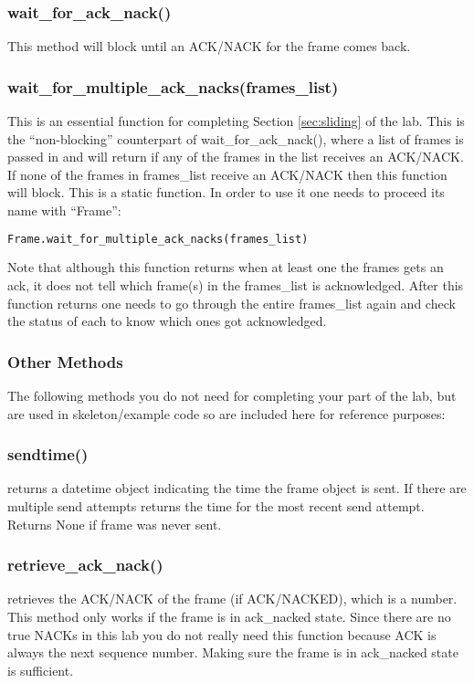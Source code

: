 \documentclass[11pt]{article}
\begin{document}
\subsubsection{wait\_for\_ack\_nack()}
This method will block until an ACK/NACK for the frame comes back.

\subsubsection{wait\_for\_multiple\_ack\_nacks(frames\_list)}
This is an essential function for completing Section \ref{sec:sliding} of the lab. This is the ``non-blocking'' counterpart of wait\_for\_ack\_nack(), where a list of frames is passed in and will return if any of the frames in the list receives an ACK/NACK. If none of the frames in frames\_list receive an ACK/NACK then this function will block. This is a static function. In order to use it one needs to proceed its name with ``Frame'':
\begin{lstlisting}[caption={Frame status}, language=python]
Frame.wait_for_multiple_ack_nacks(frames_list)
\end{lstlisting}
Note that although this function returns when at least one the frames gets an ack, it does not tell which frame(s) in the frames\_list is acknowledged. After this function returns one needs to go through the entire frames\_list again and check the status of each to know which ones got acknowledged.

\subsubsection{Other Methods}
The following methods you do not need for completing your part of the lab, but are used in skeleton/example code so are included here for reference purposes:

\subsubsection{sendtime()}
returns a datetime object indicating the time the frame object is sent. If there are multiple send attempts returns the time for the most recent send attempt. Returns None if frame was never sent.

\subsubsection{retrieve\_ack\_nack()}
retrieves the ACK/NACK of the frame (if ACK/NACKED), which is a number. This method only works if the frame is in ack\_nacked state. Since there are no true NACKs in this lab you do not really need this function because ACK is always the next sequence number. Making sure the frame is in ack\_nacked state is sufficient.
\end{document}
